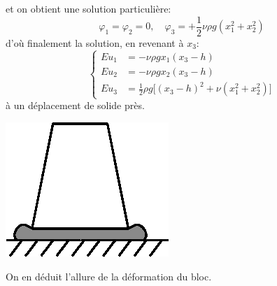 et on obtient une solution particulière:
\begin{equation}
    \varphi_1 = \varphi_2 = 0 ,\quad \varphi_3 = + \frac{1}{2}\nu\rho g \left( x_1^2 + x_2^2 \right)
    \label{eq:Ch06-040}
\end{equation}
d'où finalement la solution, en revenant à $x_3$:
\begin{equation}
    \left\{
    \begin{aligned}
        E u_1 & = -\nu \rho g x_1 \left( x_3 - h \right) \\
        E u_2 & = -\nu \rho g x_2 \left( x_3 - h \right) \\
        E u_3 & = \frac{1}{2} \rho g \bigl[ \left( x_3 - h \right)^2 + \nu \left( x_1^2 + x_2^2 \right)  \bigr]
    \end{aligned}
    \right.
    \label{eq:Ch06-041}
\end{equation}
à un déplacement de solide près.
\begin{multicols}{2}
    \begin{center}
        \includegraphics{../images/T1_Ch06-02}
    \end{center}
    \columnbreak
    On en déduit l'allure de la déformation du bloc.
\end{multicols}
